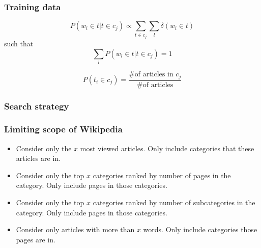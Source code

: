 \documentclass{beamer}
\begin{document}
\begin{frame}
\frametitle{Training data}

\[P(w_l \in t | t \in c_j) \propto \displaystyle \sum_{t \in c_j} \sum_l 
    \delta (w_l \in t)\]
such that
\[\displaystyle \sum_l P(w_l \in t | t \in c_j) = 1\]

\vspace{2em}

\[P(t_i \in c_j) = \frac{\text{\# of articles in } c_j}{\text{\# of articles}}\]

\end{frame}


\begin{frame}
\frametitle{Search strategy}


\end{frame}

\begin{frame}
\frametitle{Limiting scope of Wikipedia}

\begin{itemize}
\item Consider only the $x$ most viewed articles. Only include categories that
  these articles are in.

\item Consider only the top $x$ categories ranked by number of pages in the
  category. Only include pages in those categories.

\item Consider only the top $x$ categories ranked by number of subcategories in the
  category. Only include pages in those categories.

\item Consider only articles with more than $x$ words. Only include categories
  those pages are in.
\end{itemize}

\end{frame}
\end{document}
